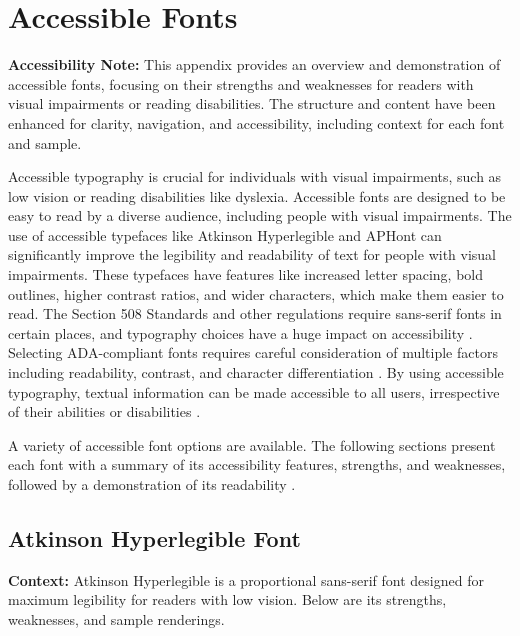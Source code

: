 \chapter{Accessible Fonts}\label{app5:appx66}
\begin{raggedright}
	\textbf{Accessibility Note:} This appendix provides an overview and demonstration of accessible fonts, focusing on their strengths and weaknesses for readers with visual impairments or reading disabilities. The structure and content have been enhanced for clarity, navigation, and accessibility, including context for each font and sample.

	Accessible typography is crucial for individuals with visual impairments, such as low vision or reading disabilities like dyslexia. Accessible fonts are designed to be easy to read by a diverse audience, including people with visual impairments. The use of accessible typefaces like Atkinson Hyperlegible and APHont can significantly improve the legibility and readability of text for people with visual impairments. These typefaces have features like increased letter spacing, bold outlines, higher contrast ratios, and wider characters, which make them easier to read. The Section 508 Standards \supercite{Section508} and other regulations require sans-serif fonts in certain places, and typography choices have a huge impact on accessibility \supercite{AccessiBe}. Selecting ADA-compliant fonts requires careful consideration of multiple factors including readability, contrast, and character differentiation \supercite{AccessiBeFonts}. By using accessible typography, textual information can be made accessible to all users, irrespective of their abilities or disabilities \supercite{ReadabilityGroup, HubSpot}.

	A variety of accessible font options are available. The following sections present each font with a summary of its accessibility features, strengths, and weaknesses, followed by a demonstration of its readability \supercite{EmptyBoxNote}.
\end{raggedright}


\section{Atkinson Hyperlegible Font}\label{app5:sec:atkinson-hyperlegible}
\noindent
\textbf{Context:} Atkinson Hyperlegible is a proportional sans-serif font designed for maximum legibility for readers with low vision. Below are its strengths, weaknesses, and sample renderings.

